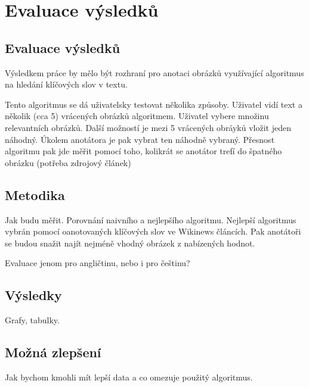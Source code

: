 
\chapter{Evaluace výsledků}

\section{Evaluace výsledků}

Výsledkem práce by mělo být rozhraní pro anotaci obrázků využívající algoritmus na hledání klíčových slov v textu.

Tento algoritmus se dá uživatelsky testovat několika způsoby. Uživatel vidí text a několik (cca 5) vrácených obrázků algoritmem. Uživatel vybere množinu relevantních obrázků. Další možností je mezi 5 vrácených obráyků vložit jeden náhodný. Úkolem anotátora je pak vybrat ten náhodně vybraný. Přesnost algoritmu pak jde měřit pomocí toho, kolikrát se anotátor trefí do špatného obrázku (potřeba zdrojový článek)


\section{Metodika}

Jak budu měřit. Porovnání naivního a nejlepšího algoritmu. Nejlepší algoritmus vybrán pomocí oanotovaných klíčových slov ve Wikinews článcích. Pak anotátoři se budou snažit najít nejméně vhodný obrázek z nabízených hodnot.

Evaluace jenom pro angličtinu, nebo i pro češtinu?

\section{Výsledky}

Grafy, tabulky.

\section{Možná zlepšení}

Jak bychom kmohli mít lepší data a co omezuje použitý algoritmus.